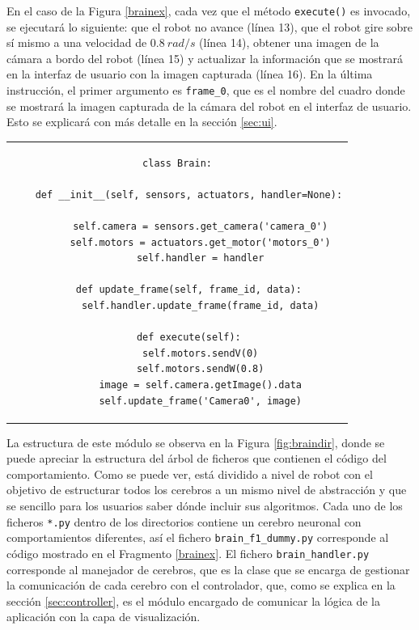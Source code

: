 En el caso de la Figura \ref{brainex}, cada vez que el método \lstinline{execute()} es invocado, se ejecutará lo siguiente: que el robot no avance (línea 13), que el robot gire sobre sí mismo a una velocidad de $0.8\ rad/s$ (línea 14), obtener una imagen de la cámara a bordo del robot (línea 15) y actualizar la información que se mostrará en la interfaz de usuario con la imagen capturada (línea 16). En la última instrucción, el primer argumento es \lstinline{frame_0}, que es el nombre del cuadro donde se mostrará la imagen capturada de la cámara del robot en el interfaz de usuario. Esto se explicará con más detalle en la sección \ref{sec:ui}.

\begin{tabular}{c}
\begin{lstlisting}[caption={Ejemplo de implementación de cerebro no neuronal},label=brainex,style=Python] 
class Brain:
    
    def __init__(self, sensors, actuators, handler=None):
       
        self.camera = sensors.get_camera('camera_0')
        self.motors = actuators.get_motor('motors_0')
        self.handler = handler

    def update_frame(self, frame_id, data):
        self.handler.update_frame(frame_id, data)

    def execute(self):
        self.motors.sendV(0)
        self.motors.sendW(0.8)
        image = self.camera.getImage().data
        self.update_frame('Camera0', image)
\end{lstlisting}
\end{tabular}


La estructura de este módulo se observa en la Figura \ref{fig:braindir}, donde se puede apreciar la estructura del árbol de ficheros que contienen el código del comportamiento. Como se puede ver, está dividido a nivel de robot con el objetivo de estructurar todos los cerebros a un mismo nivel de abstracción y que se sencillo para los usuarios saber dónde incluir sus algoritmos. Cada uno de los ficheros \lstinline{*.py} dentro de los directorios contiene un cerebro neuronal con comportamientos diferentes, así el fichero \lstinline{brain_f1_dummy.py} corresponde al código mostrado en el Fragmento \ref{brainex}. El fichero \lstinline{brain_handler.py} corresponde al manejador de cerebros, que es la clase que se encarga de gestionar la comunicación de cada cerebro con el controlador, que, como se explica en la sección \ref{sec:controller}, es el módulo encargado de comunicar la lógica de la aplicación con la capa de visualización.

